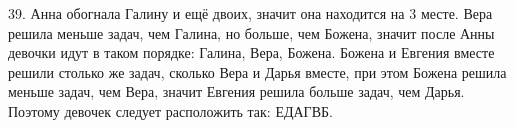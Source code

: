 39. Анна обогнала Галину и ещё двоих, значит она находится на 3 месте. Вера решила меньше задач, чем Галина, но больше, чем Божена, значит после Анны девочки идут в таком порядке: Галина, Вера, Божена. Божена и Евгения вместе решили столько же задач, сколько Вера и Дарья вместе, при этом Божена решила меньше задач, чем Вера, значит Евгения решила больше задач, чем Дарья. Поэтому девочек следует расположить так: ЕДАГВБ.\\
